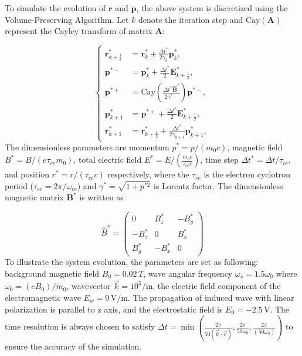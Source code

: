 \documentclass{cpbtex3}
\begin{document}
To simulate the evolution of $\bm{r}$ and $\bm{p}$, the above system is discretized using the Volume-Preserving Algorithm. Let $k$ denote the iteration step and $\text{Cay}(\bm{A})$ represent the Cayley transform of matrix $\bm{A}$:

\begin{equation}
\left\{
\begin{aligned}
\bm{r}^*_{k+\frac{1}{2}} &= \bm{r}^*_k + \frac{\Delta t^*}{2 \gamma_k} \bm{p}^*_k, \\
\bm{p}^{*-} &= \bm{p}^*_k + \frac{\Delta t^*}{2} \bm{E}^*_{k+\frac{1}{2}}, \\
\bm{p}^{*+} &= \text{Cay} \left( \frac{\Delta t^* \hat{\bm{B}}^*}{2 \gamma^{*-}} \right) \bm{p}^{*-}, \\
\bm{p}^*_{k+1} &= \bm{p}^{*+} + \frac{\Delta t^*}{2} \bm{E}^*_{k+\frac{1}{2}}, \\
\bm{r}^*_{k+1} &= \bm{r}^*_{k+\frac{1}{2}} + \frac{\Delta t^*}{2 \gamma_{k+1}} \bm{p}^*_{k+1},
\end{aligned}
\right.
\end{equation}
The dimensionless parameters are momentum \( p^* = p/(m_0 c) \), magnetic field \( B^* = B/(e \tau_{ce} m_0) \), total electric field \( E^* = E/(\frac{m_0 c}{\tau_{ce} e}) \), time step \( \Delta t^* = \Delta t / \tau_{ce} \), and position \( r^* = r / (\tau_{ce} c) \) respectively, where the \( \tau_{ce} \) is the electron cyclotron period (\( \tau_{ce} = 2\pi / \omega_{ce} \)) and \( \gamma^* = \sqrt{1 + p^{*2}} \) is Lorentz factor. The dimensionless magnetic matrix \( \mathbf{B}^* \) \cite{zhang2015volume} is written as

\begin{equation}
\hat{B}^* =
\begin{pmatrix}
0 & B_z^* & -B_y^* \\
-B_z^* & 0 & B_x^* \\
B_y^* & -B_x^* & 0
\end{pmatrix}
\end{equation}
To illustrate the system evolution, the parameters are set as following: background magnetic field \( B_0 = 0.02\,T \), wave angular frequency \( \omega_s = 1.5 \omega_0 \) where \( \omega_0 = (e B_0)/m_0 \), wavevector \( \vec{k} = 10^5/\mathrm{m} \), the electric field component of the electromagnetic wave \( E_w = 9\,\mathrm{V/m} \). The propagation of induced wave with linear polarization is parallel to z axis, and the electrostatic field is \( E_0 = -2.5\,\mathrm{V} \). The time resolution is always chosen to satisfy 
\(
\Delta t = \min \left( \frac{2\pi}{50(\vec{k} \cdot \vec{v})}, \frac{2\pi}{50\omega_0}, \frac{2\pi}{(50\omega_0)} \right)
\)
to ensure the accuracy of the simulation.
\end{document}
